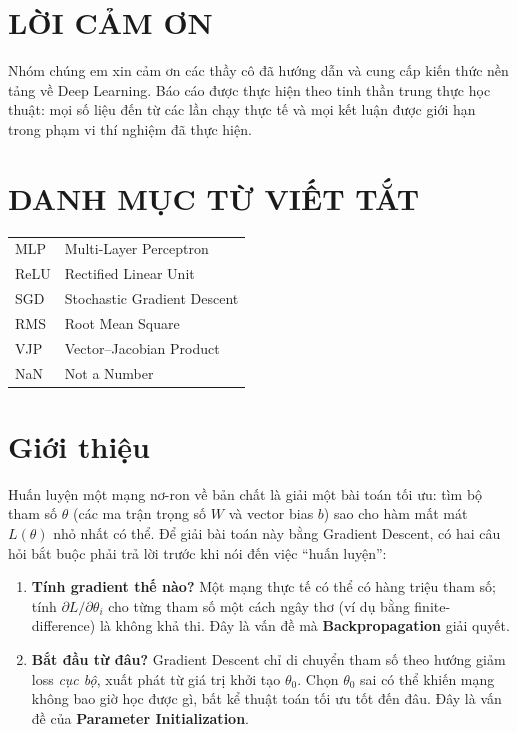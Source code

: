 \documentclass[12pt,a4paper]{article}
\begin{document}
\section*{LỜI CẢM ƠN}
Nhóm chúng em xin cảm ơn các thầy cô đã hướng dẫn và cung cấp kiến thức nền tảng về Deep Learning. Báo cáo được thực hiện theo tinh thần trung thực học thuật: mọi số liệu đến từ các lần chạy thực tế và mọi kết luận được giới hạn trong phạm vi thí nghiệm đã thực hiện.

\section*{DANH MỤC TỪ VIẾT TẮT}
\begin{tabular}{ll}
MLP & Multi-Layer Perceptron \\
ReLU & Rectified Linear Unit \\
SGD & Stochastic Gradient Descent \\
RMS & Root Mean Square \\
VJP & Vector--Jacobian Product \\
NaN & Not a Number \\
\end{tabular}


\tableofcontents

\listoffigures
\listoftables


\section{Giới thiệu}

Huấn luyện một mạng nơ-ron về bản chất là giải một bài toán tối ưu: tìm bộ
tham số $\theta$ (các ma trận trọng số $W$ và vector bias $b$) sao cho hàm
mất mát $L(\theta)$ nhỏ nhất có thể. Để giải bài toán này bằng Gradient
Descent, có hai câu hỏi bắt buộc phải trả lời trước khi nói đến việc ``huấn
luyện'':

\begin{enumerate}
\item \textbf{Tính gradient thế nào?} Một mạng thực tế có thể có hàng triệu
  tham số; tính $\partial L/\partial\theta_i$ cho từng tham số một cách
  ngây thơ (ví dụ bằng finite-difference) là không khả thi. Đây là vấn đề
  mà \textbf{Backpropagation} giải quyết.
\item \textbf{Bắt đầu từ đâu?} Gradient Descent chỉ di chuyển tham số theo
  hướng giảm loss \emph{cục bộ}, xuất phát từ giá trị khởi tạo $\theta_0$.
  Chọn $\theta_0$ sai có thể khiến mạng không bao giờ học được gì, bất kể
  thuật toán tối ưu tốt đến đâu. Đây là vấn đề của
  \textbf{Parameter Initialization}.
\end{enumerate}
\end{document}
